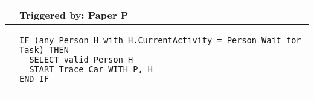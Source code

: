 \begin{longtable}{@{}>{\raggedright\arraybackslash}p{0.25cm}>{\raggedright\arraybackslash}p{13cm}@{}}
  \toprule
   & Triggered by: Paper P\\ \midrule 
  &
\begin{lstlisting}[language=CMPseudo]
IF (any Person H with H.CurrentActivity = Person Wait for Task) THEN
  SELECT valid Person H
  START Trace Car WITH P, H
END IF
\end{lstlisting}
  \\ \bottomrule
  \end{longtable}